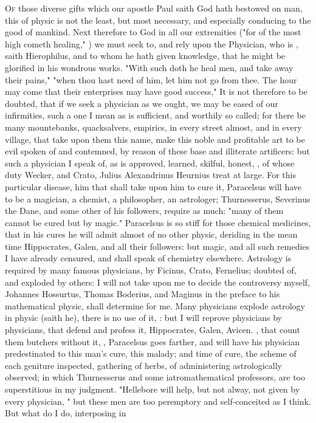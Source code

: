 {\lettrine{O}{f} those diverse gifts which our apostle Paul saith God hath bestowed on man, this of physic is not the least, but most necessary, and especially conducing to the good of mankind. Next therefore to God in all our extremities ("for of the most high cometh healing," ) we must seek to, and rely upon the Physician, who is , saith Hierophilus, and to whom he hath given knowledge, that he might be glorified in his wondrous works. "With such doth he heal men, and take away their pains,"  "when thou hast need of him, let him not go from thee. The hour may come that their enterprises may have good success,"  It is not therefore to be doubted, that if we seek a physician as we ought, we may be eased of our infirmities, such a one I mean as is sufficient, and worthily so called; for there be many mountebanks, quacksalvers, empirics, in every street almost, and in every village, that take upon them this name, make this noble and profitable art to be evil spoken of and contemned, by reason of these base and illiterate artificers: but such a physician I speak of, as is approved, learned, skilful, honest, \etc{}, of whose duty Wecker,  and  Crato, Julius Alexandrinus  Heurnius  \etc{} treat at large. For this particular disease, him that shall take upon him to cure it, Paracelsus will have to be a magician, a chemist, a philosopher, an astrologer; Thurnesserus, Severinus the Dane, and some other of his followers, require as much: "many of them cannot be cured but by magic." Paracelsus is so stiff for those chemical medicines, that in his cures he will admit almost of no other physic, deriding in the mean time Hippocrates, Galen, and all their followers: but magic, and all such remedies I have already censured, and shall speak of chemistry elsewhere. Astrology is required by many famous physicians, by Ficinus, Crato, Fernelius; doubted of, and exploded by others: I will not take upon me to decide the controversy myself, Johannes Hossurtus, Thomas Boderius, and Maginus in the preface to his mathematical physic, shall determine for me. Many physicians explode astrology in physic (saith he), there is no use of it, : but I will reprove physicians by physicians, that defend and profess it, Hippocrates, Galen, Avicen. \etc{}, that count them butchers without it, , \etc{} Paracelsus goes farther, and will have his physician predestinated to this man's cure, this malady; and time of cure, the scheme of each geniture inspected, gathering of herbs, of administering astrologically observed; in which Thurnesserus and some iatromathematical professors, are too superstitious in my judgment. "Hellebore will help, but not alway, not given by every physician, \etc{}" but these men are too peremptory and self-conceited as I think. But what do I do, interposing in }
